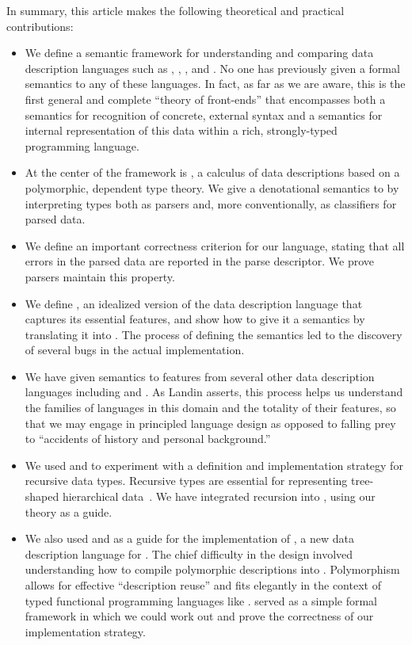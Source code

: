 In summary, this article makes the following theoretical and practical
contributions:
%
\begin{itemize}
\item We define a semantic framework for understanding and comparing 
data description languages such as \padsc{}, \padsml{},
\packettypes{}, and \datascript{}.
No one has previously given a formal semantics to any of these 
languages.  In fact, as far as we are aware, this is the first
general and complete ``theory of front-ends'' that encompasses 
both a semantics for recognition of concrete, external syntax and 
a semantics for internal representation of this data within a
rich, strongly-typed programming language.

\item At the center of the framework is \ddc{},
a calculus of data descriptions based on a polymorphic, dependent type theory.
We give a denotational semantics
to \ddc{} by interpreting
types both as parsers and, more conventionally, 
as classifiers for parsed data. 

\item We define an important correctness criterion for our language,
stating that all errors in the parsed data are reported in the parse 
descriptor.  We prove \ddc{} parsers maintain this property.

\item We define \ipads{}, an idealized
version of the \padsc{} data description language
that captures its essential features,
and show how to give it a semantics by translating it into \ddc{}.  
The process of defining the semantics led to the
discovery of several bugs in the actual implementation.

\item We have given semantics to features from several other data description
languages including \packettypes{} and \datascript{}.  As Landin asserts, 
this process helps us understand the families of languages in this domain
and the totality of their features, so that we may engage in principled
language design
as opposed to falling prey to ``accidents of history and personal background.''

\item We used \ipads{} and \ddc{} to experiment with 
a definition and implementation strategy for recursive data types.  
Recursive types are essential for representing 
tree-shaped hierarchical
data~\cite{geneontology,newick-data}.  
We have integrated recursion into \padsc{},
using our theory as a guide. 

\item We also used \ipads{} and \ddc{} as a guide for the 
implementation of \padsml{},
a new data description language for \ocaml{}.  The chief difficulty
in the design involved understanding how to compile
polymorphic descriptions into \ocaml{}.  Polymorphism allows for effective
``description reuse'' and fits elegantly in the context of
typed functional programming languages like \ocaml{}.  \ddc{} served as
a simple formal framework in which we could work out and prove the
correctness of our implementation strategy.
\end{itemize}

